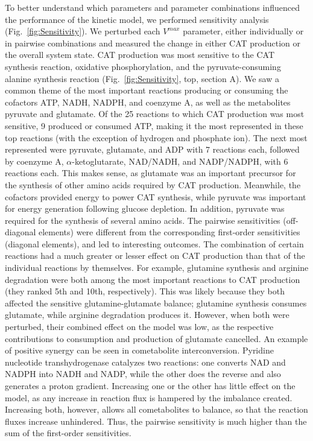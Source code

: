 \documentclass[12pt]{article}
\begin{document}
To better understand which parameters and parameter combinations influenced the performance of the kinetic model, we performed sensitivity analysis (Fig.~\ref{fig:Sensitivity}).
We perturbed each $V^{max}$ parameter, either individually or in pairwise combinations and measured the change in either CAT production or the overall system state.
CAT production was most sensitive to the CAT synthesis reaction, oxidative phosphorylation, and the pyruvate-consuming alanine synthesis reaction (Fig.~\ref{fig:Sensitivity}, top, section A).
We saw a common theme of the most important reactions producing or consuming the cofactors ATP, NADH, NADPH, and coenzyme A, as well as the metabolites pyruvate and glutamate.
Of the 25 reactions to which CAT production was most sensitive, 9 produced or consumed ATP, making it the most represented in these top reactions (with the exception of hydrogen and phosphate ion).
The next most represented were pyruvate, glutamate, and ADP with 7 reactions each, followed by coenzyme A, $\alpha$-ketoglutarate, NAD/NADH, and NADP/NADPH, with 6 reactions each.
This makes sense, as glutamate was an important precursor for the synthesis of other amino acids required by CAT production.
Meanwhile, the cofactors provided energy to power CAT synthesis, while pyruvate was important for energy generation following glucose depletion.
In addition, pyruvate was required for the synthesis of several amino acids.
The pairwise sensitivities (off-diagonal elements) were different from the corresponding first-order sensitivities (diagonal elements), and led to interesting outcomes.
The combination of certain reactions had a much greater or lesser effect on CAT production than that of the individual reactions by themselves.
For example, glutamine synthesis and arginine degradation were both among the most important reactions to CAT production (they ranked 5th and 10th, respectively).
This was likely because they both affected the sensitive glutamine-glutamate balance; glutamine synthesis consumes glutamate, while arginine degradation produces it.
However, when both were perturbed, their combined effect on the model was low, as the respective contributions to consumption and production of glutamate cancelled.
An example of positive synergy can be seen in cometabolite interconversion.
Pyridine nucleotide transhydrogenase catalyzes two reactions: one converts NAD and NADPH into NADH and NADP, while the other does the reverse and also generates a proton gradient.
Increasing one or the other has little effect on the model, as any increase in reaction flux is hampered by the imbalance created.
Increasing both, however, allows all cometabolites to balance, so that the reaction fluxes increase unhindered.
Thus, the pairwise sensitivity is much higher than the sum of the first-order sensitivities.
\end{document}
